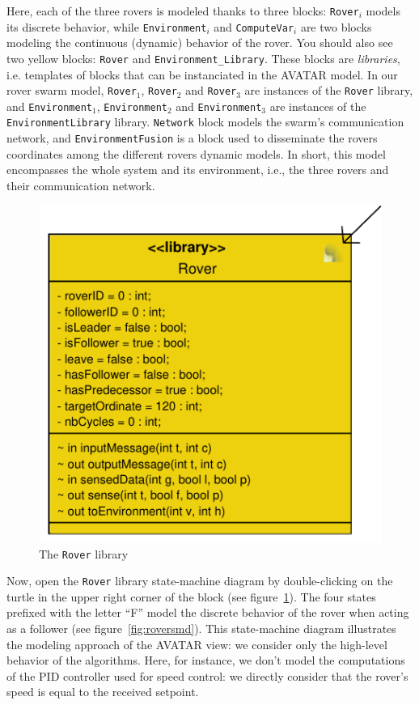 \documentclass{article}
\begin{document}
Here, each of the three rovers is modeled thanks to three blocks: \texttt{Rover$_i$} models its discrete behavior, while \texttt{Environment$_i$} and \texttt{ComputeVar$_i$} are two blocks modeling the continuous (dynamic) behavior of the rover. You should also see two yellow blocks: \texttt{Rover} and \texttt{Environment\_Library}. These blocks are \emph{libraries}, i.e. templates of blocks that can be instanciated in the AVATAR model. In our rover swarm model, \texttt{Rover$_1$}, \texttt{Rover$_2$} and \texttt{Rover$_3$} are instances of the \texttt{Rover} library, and \texttt{Environment$_1$}, \texttt{Environment$_2$} and \texttt{Environment$_3$} are instances of the \texttt{EnvironmentLibrary} library. \texttt{Network} block models the swarm's communication network, and \texttt{EnvironmentFusion} is a block used to disseminate the rovers coordinates among the different rovers dynamic models. In short, this model encompasses the whole system and its environment, i.e., the three rovers and their communication network.

\begin{figure}
	\centering
	\includegraphics[scale=.6]{figures/roverlibrary.pdf}
	\caption{The \texttt{Rover} library}
	\label{fig:opensmd}
\end{figure}

Now, open the \texttt{Rover} library state-machine diagram by double-clicking on the turtle in the upper right corner of the block (see figure~\ref{fig:opensmd}). The four states prefixed with the letter ``F'' model the discrete behavior of the rover when acting as a follower (see figure~\ref{fig:roversmd}). This state-machine diagram illustrates the modeling approach of the AVATAR view: we consider only the high-level behavior of the algorithms. Here, for instance, we don't model the computations of the PID controller used for speed control: we directly consider that the rover's speed is equal to the received setpoint.
\end{document}
